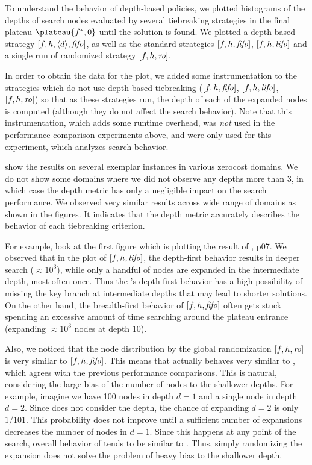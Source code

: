 To understand the behavior of depth-based policies, we plotted 
histograms of the depths of search nodes evaluated by several tiebreaking
strategies in the final plateau $\plateau{f^*,0}$ until the solution is
found.  We plotted a depth-based strategy
$[f,h,{\left<d\right>},{\text{\textit{fifo}}}]$, as well as the standard strategies $[f,h,{\text{\textit{fifo}}}]$,
$[f,h,{\text{\textit{lifo}}}]$ and a single run of randomized strategy $[f,h,{\text{\textit{ro}}}]$.

In order to obtain the data for the plot, we added some instrumentation to the strategies which do not use depth-based tiebreaking ($[f,h,{\text{\textit{fifo}}}]$, $[f,h,{\text{\textit{lifo}}}]$, $[f,h,{\text{\textit{ro}}}]$) so that as these strategies run, the depth of each of the expanded nodes is computed (although they do not affect the search behavior).
Note that this instrumentation, which adds some runtime overhead, was \emph{not}
used in the performance comparison experiments above, and were only used for this experiment, which analyzes search behavior.


 show the results on several exemplar instances in
various zerocost domains.  We do not show some domains where we did not observe any depths more than 3, in which case
the depth metric has only a negligible impact on the search performance.
We observed very similar results across wide range of domains as shown in the figures.
It indicates that the depth metric accurately describes the behavior of each tiebreaking criterion.

For example, look at the first figure which is plotting the result of , p07.
% 
We observed that in the plot of $[f,h,{\text{\textit{lifo}}}]$, the depth-first behavior results in deeper search ($\approx 10^3$), while
only a handful of nodes are expanded in the intermediate depth, most often once. Thus the \lifo's depth-first
behavior has a high possibility of missing the key branch at intermediate depths that may lead to shorter solutions.
On the other hand, the breadth-first behavior of $[f,h,{\text{\textit{fifo}}}]$ often gets stuck spending an excessive amount of
time searching around the plateau entrance (expanding $\approx 10^3$ nodes at depth 10).

Also, we noticed that the node distribution by the global randomization $[f,h,{\text{\textit{ro}}}]$ is very similar to $[f,h,{\text{\textit{fifo}}}]$.
This means that \ro actually behaves very similar to \fifo, which agrees with the previous performance comparisons.
This is natural, considering the large bias of the number of nodes to the shallower depths.
For example, imagine we have 100 nodes in depth $d=1$ and a single node in depth $d=2$.
Since \ro does not consider the depth, the chance of expanding $d=2$ is only $1/101$.
This probability does not improve until a sufficient number of expansions decreases the number of nodes in $d=1$.
Since this happens at any point of the search, overall behavior of \ro tends to be similar to \fifo.
Thus, simply randomizing the expansion does not solve the problem of heavy bias to the shallower depth.

